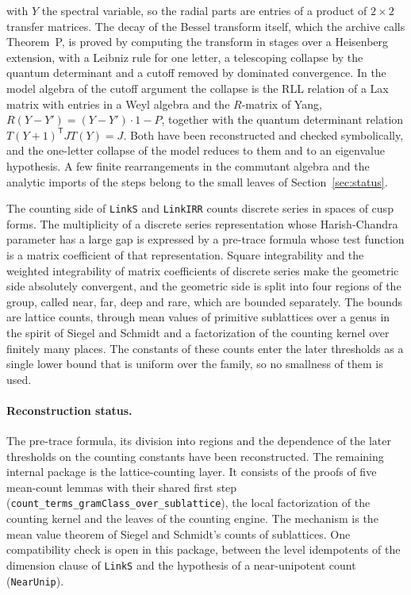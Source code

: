 \documentclass[11pt,letterpaper]{article}
\numberwithin{equation}{section}
\begin{document}
with $Y$ the spectral variable, so the radial parts are entries of a product of $2\times2$ transfer matrices. The decay of the Bessel transform itself, which the archive calls Theorem~P, is proved by computing the transform in stages over a Heisenberg extension, with a Leibniz rule for one letter, a telescoping collapse by the quantum determinant and a cutoff removed by dominated convergence. In the model algebra of the cutoff argument the collapse is the RLL relation of a Lax matrix with entries in a Weyl algebra and the $R$-matrix of Yang, $R(Y-Y')=(Y-Y')\cdot1-P$, together with the quantum determinant relation $T(Y+1)^{\mathsf T}JT(Y)=J$. Both have been reconstructed and checked symbolically, and the one-letter collapse of the model reduces to them and to an eigenvalue hypothesis. A few finite rearrangements in the commutant algebra and the analytic imports of the steps belong to the small leaves of Section~\ref{sec:status}.

The counting side of \texttt{LinkS} and \texttt{LinkIRR} counts discrete series in spaces of cusp forms. The multiplicity of a discrete series representation whose Harish-Chandra parameter has a large gap is expressed by a pre-trace formula whose test function is a matrix coefficient of that representation. Square integrability and the weighted integrability of matrix coefficients of discrete series make the geometric side absolutely convergent, and the geometric side is split into four regions of the group, called near, far, deep and rare, which are bounded separately. The bounds are lattice counts, through mean values of primitive sublattices over a genus in the spirit of Siegel and Schmidt and a factorization of the counting kernel over finitely many places. The constants of these counts enter the later thresholds as a single lower bound that is uniform over the family, so no smallness of them is used.

\paragraph{Reconstruction status.} The pre-trace formula, its division into regions and the dependence of the later thresholds on the counting constants have been reconstructed. The remaining internal package is the lattice-counting layer. It consists of the proofs of five mean-count lemmas with their shared first step (\texttt{count\_terms\_gramClass\_over\_sublattice}), the local factorization of the counting kernel and the leaves of the counting engine. The mechanism is the mean value theorem of Siegel and Schmidt's counts of sublattices. One compatibility check is open in this package, between the level idempotents of the dimension clause of \texttt{LinkS} and the hypothesis of a near-unipotent count (\texttt{NearUnip}).
\end{document}
